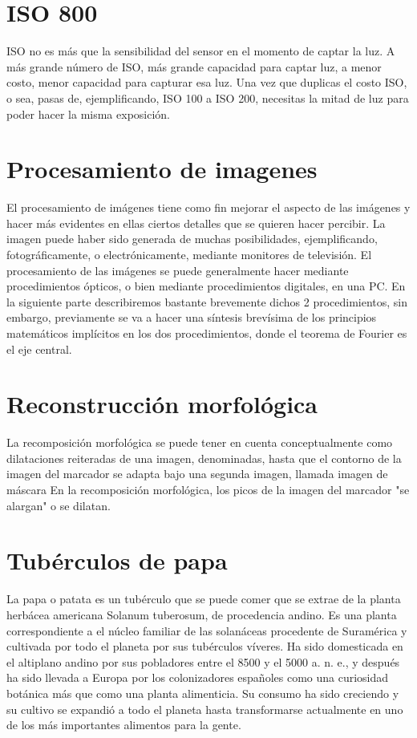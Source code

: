 	\section{ISO 800} ISO no es más que la sensibilidad del sensor en el momento de captar la luz. A más grande número de ISO, más grande capacidad para captar luz, a menor costo, menor capacidad para capturar esa luz. Una vez que duplicas el costo ISO, o sea, pasas de, ejemplificando, ISO 100 a ISO 200, necesitas la mitad de luz para poder hacer la misma exposición.
	\\ 
	
	\section{Procesamiento de imagenes} El procesamiento de imágenes tiene como fin mejorar el aspecto de las imágenes y hacer más evidentes en ellas ciertos detalles que se quieren hacer percibir. La imagen puede haber sido generada de muchas posibilidades, ejemplificando, fotográficamente, o electrónicamente, mediante monitores de televisión. El procesamiento de las imágenes se puede generalmente hacer mediante procedimientos ópticos, o bien mediante procedimientos digitales, en una PC. En la siguiente parte describiremos bastante brevemente dichos 2 procedimientos, sin embargo, previamente se va a hacer una síntesis brevísima de los principios matemáticos implícitos en los dos procedimientos, donde el teorema de Fourier es el eje central.
	\\ 
	
	\section{Reconstrucción morfológica} La recomposición morfológica se puede tener en cuenta conceptualmente como dilataciones reiteradas de una imagen, denominadas, hasta que el contorno de la imagen del marcador se adapta bajo una segunda imagen, llamada imagen de máscara En la recomposición morfológica, los picos de la imagen del marcador "se alargan" o se dilatan.
	\\ 
	
	\section{Tubérculos de papa} La papa o patata es un tubérculo que se puede comer que se extrae de la planta herbácea americana Solanum tuberosum, de procedencia andino. Es una planta correspondiente a el núcleo familiar de las solanáceas procedente de Suramérica y cultivada por todo el planeta por sus tubérculos víveres. Ha sido domesticada en el altiplano andino por sus pobladores entre el 8500 y el 5000 a. n. e., y después ha sido llevada a Europa por los colonizadores españoles como una curiosidad botánica más que como una planta alimenticia. Su consumo ha sido creciendo y su cultivo se expandió a todo el planeta hasta transformarse actualmente en uno de los más importantes alimentos para la gente.
	\\ 
	
